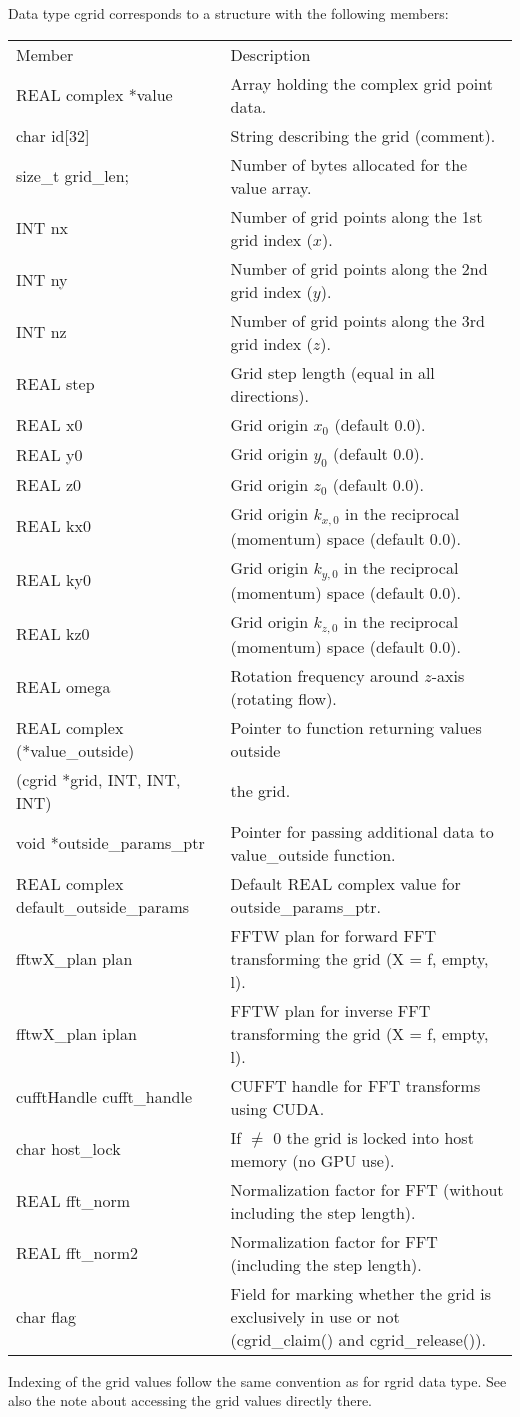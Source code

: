 \documentclass[12pt,letterpaper]{report}
\begin{document}
Data type cgrid corresponds to a structure with the following members:
\begin{longtable}{p{} p{}}
Member & Description\\
\cline{1-2}
REAL complex *value & Array holding the complex grid point data.\\
char id[32] & String describing the grid (comment).\\ 
size\_t grid\_len; & Number of bytes allocated for the value array.\\
INT nx & Number of grid points along the 1st grid index ($x$).\\
INT ny & Number of grid points along the 2nd grid index ($y$).\\
INT nz & Number of grid points along the 3rd grid index ($z$).\\
REAL step & Grid step length (equal in all directions).\\
REAL x0 & Grid origin $x_0$ (default 0.0).\\
REAL y0 & Grid origin $y_0$ (default 0.0).\\
REAL z0 & Grid origin $z_0$ (default 0.0).\\
REAL kx0 & Grid origin $k_{x,0}$ in the reciprocal (momentum) space (default 0.0).\\
REAL ky0 & Grid origin $k_{y,0}$ in the reciprocal (momentum) space (default 0.0).\\
REAL kz0 & Grid origin $k_{z,0}$ in the reciprocal (momentum) space (default 0.0).\\
REAL omega & Rotation frequency around $z$-axis (rotating flow).\\
REAL complex (*value\_outside) & Pointer to function returning values outside\\
\phantom{X}(cgrid *grid, INT, INT, INT) & the grid.\\
void *outside\_params\_ptr & Pointer for passing additional data to value\_outside function.\\
REAL complex default\_outside\_params & Default REAL complex value for outside\_params\_ptr.\\
fftwX\_plan plan & FFTW plan for forward FFT transforming the grid (X = f, empty, l).\\
fftwX\_plan iplan & FFTW plan for inverse FFT transforming the grid (X = f, empty, l).\\
cufftHandle cufft\_handle & CUFFT handle for FFT transforms using CUDA.\\
char host\_lock & If $\ne$ 0 the grid is locked into host memory (no GPU use).\\
REAL fft\_norm & Normalization factor for FFT (without including the step length).\\
REAL fft\_norm2 & Normalization factor for FFT (including the step length).\\
char flag & Field for marking whether the grid is exclusively in use or not (cgrid\_claim() and cgrid\_release()).\\
\end{longtable}
\noindent
Indexing of the grid values follow the same convention as for rgrid data type. See also the note about accessing the grid values directly there.
\end{document}
